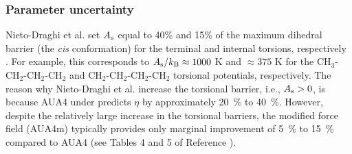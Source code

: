 \documentclass[preprint,review,12pt]{elsarticle}
\begin{document}
%	

    \subsubsection{Parameter uncertainty} \label{sec:parameter_uncertainty}

	Nieto-Draghi et al. set $A_{\rm s}$ equal to 40\% and 15\% of the maximum dihedral barrier (the \textit{cis} conformation) for the terminal and internal torsions, respectively \cite{Nieto2006,Nieto2008}. For example, this corresponds to $A_{\rm s}/k_{\rm B} \approx 1000$ K and $\approx 375$ K for the CH$_3$-CH$_2$-CH$_2$-CH$_2$ and CH$_2$-CH$_2$-CH$_2$-CH$_2$ torsional potentials, respectively. The reason why Nieto-Draghi et al. increase the torsional barrier, i.e., $A_{\rm s} > 0$, is because AUA4 under predicts $\eta$ by approximately 20~\% to 40~\%. However, despite the relatively large increase in the torsional barriers, the modified force field (AUA4m) typically provides only marginal improvement of 5~\% to 15~\% compared to AUA4 (see Tables 4 and 5 of Reference ). 
	
	
	
\end{document}
